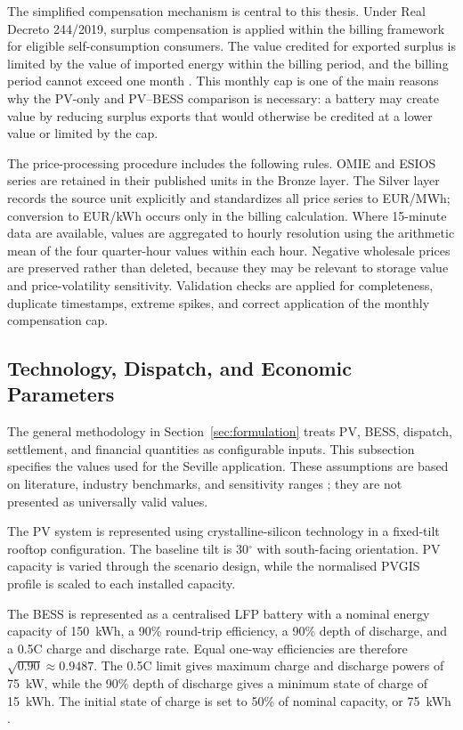 The simplified compensation mechanism is central to this thesis. Under Real Decreto 244/2019, surplus compensation is applied within the billing framework for eligible self-consumption consumers. The value credited for exported surplus is limited by the value of imported energy within the billing period, and the billing period cannot exceed one month \cite{boe2019real}. This monthly cap is one of the main reasons why the PV-only and PV--BESS comparison is necessary: a battery may create value by reducing surplus exports that would otherwise be credited at a lower value or limited by the cap.

The price-processing procedure includes the following rules. OMIE and ESIOS series are retained in their published units in the Bronze layer. The Silver layer records the source unit explicitly and standardizes all price series to EUR/MWh; conversion to EUR/kWh occurs only in the billing calculation. Where 15-minute data are available, values are aggregated to hourly resolution using the arithmetic mean of the four quarter-hour values within each hour. Negative wholesale prices are preserved rather than deleted, because they may be relevant to storage value and price-volatility sensitivity. Validation checks are applied for completeness, duplicate timestamps, extreme spikes, and correct application of the monthly compensation cap.

\subsection{Technology, Dispatch, and Economic Parameters}
\label{sec:technology_economic_parameters}

The general methodology in Section~\ref{sec:formulation} treats PV, BESS, dispatch, settlement, and financial quantities as configurable inputs. This subsection specifies the values used for the Seville application. These assumptions are based on literature, industry benchmarks, and sensitivity ranges \cite{iea2024international,nrel2024national,irena2025international}; they are not presented as universally valid values.

The PV system is represented using crystalline-silicon technology in a fixed-tilt rooftop configuration. The baseline tilt is 30$^\circ$ with south-facing orientation. PV capacity is varied through the scenario design, while the normalised PVGIS profile is scaled to each installed capacity.

The BESS is represented as a centralised LFP battery with a nominal energy capacity of 150~kWh, a 90\% round-trip efficiency, a 90\% depth of discharge, and a 0.5C charge and discharge rate. Equal one-way efficiencies are therefore $\sqrt{0.90}\approx0.9487$. The 0.5C limit gives maximum charge and discharge powers of 75~kW, while the 90\% depth of discharge gives a minimum state of charge of 15~kWh. The initial state of charge is set to 50\% of nominal capacity, or 75~kWh \cite{iea2024international,nrel2024national}.

